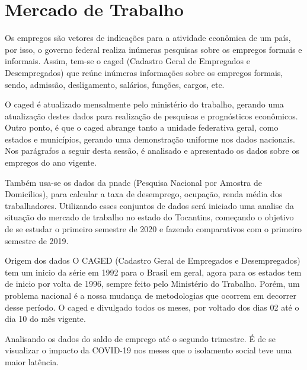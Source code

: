 \chapter{Mercado de Trabalho}

\par Os empregos são  vetores de indicações para a atividade econômica de um país, por isso, o governo federal realiza inúmeras pesquisas sobre os empregos formais e informais. Assim, tem-se o \acrshort{caged} (Cadastro Geral de Empregados e Desempregados) que reúne inúmeras informações sobre os empregos formais, sendo, admissão, desligamento, salários, funções, cargos, etc.
\par O \acrshort{caged} é atualizado mensalmente pelo ministério do trabalho, gerando uma atualização destes dados para realização de pesquisas e prognósticos econômicos. Outro ponto, é que o \acrshort{caged} abrange tanto a unidade federativa geral, como estados e municípios, gerando uma demonstração uniforme nos dados nacionais. Nos parágrafos a seguir desta sessão, é analisado e apresentado os dados sobre os empregos do ano vigente.
\par Também usa-se os dados da \acrshort{pnadc} (Pesquisa Nacional por Amostra de Domicílios), para calcular a taxa de desemprego, ocupação, renda média dos trabalhadores. Utilizando esses conjuntos de dados será iniciado uma analise da situação do mercado de trabalho no estado do Tocantins, começando  o objetivo de se estudar o primeiro semestre de 2020 e fazendo comparativos com o primeiro semestre de 2019.

\begin{smbox}[label={labelbox},nameref={Empregos}]{Origem dos dados}
	O CAGED (Cadastro Geral de Empregados e Desempregados) tem um inicio da série em 1992 para o Brasil em geral, agora para os estados tem de inicio por volta de 1996, sempre feito pelo Ministério do Trabalho. Porém, um problema nacional é a nossa mudança de metodologias que ocorrem em decorrer desse período. O \acrshort{caged} e divulgado todos os meses, por voltado dos dias 02 até o dia 10 do mês vigente.
\end{smbox}

\par Analisando os dados do saldo de emprego até o segundo trimestre. É de se visualizar o impacto da COVID-19 nos meses que o isolamento social teve uma maior latência.

